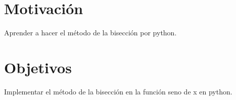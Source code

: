 

\section{Motivación}
\label{1:sec:1}
 Aprender a hacer el método de la bisección por python.

\section{Objetivos}
\label{1:sec:2}
 Implementar el método de la bisección en la función seno de x en python.



